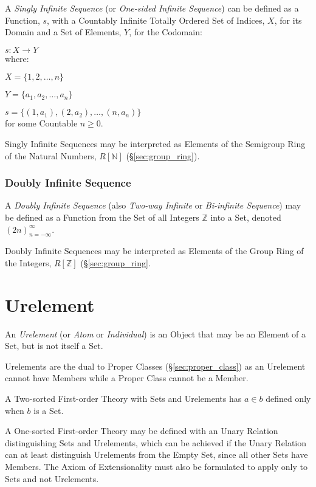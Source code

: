 A \emph{Singly Infinite Sequence} (or \emph{One-sided Infinite
  Sequence}) can be defined as a Function, $s$, with a Countably
Infinite Totally Ordered Set of Indices, $X$, for its Domain and a Set
of Elements, $Y$, for the Codomain:

  $s : X \rightarrow Y$ \\
where:

  $X = \{1,2,\ldots,n\}$

  $Y = \{a_1, a_2,\ldots,a_n\}$

  $s = \{(1,a_1), (2,a_2),\ldots, (n,a_n)\}$ \\
for some Countable $n \geq 0$.

Singly Infinite Sequences may be interpreted as Elements of the
Semigroup Ring of the Natural Numbers, $R[\mathbb{N}]$
(\S\ref{sec:group_ring}).



\subsubsection{Doubly Infinite Sequence}\label{sec:doubly_infinite}

A \emph{Doubly Infinite Sequence} (also \emph{Two-way Infinite} or
\emph{Bi-infinite Sequence}) may be defined as a Function from the Set
of all Integers $\mathbb{Z}$ into a Set, denoted
$(2n)^{\infty}_{n=-\infty}$.

Doubly Infinite Sequences may be interpreted as Elements of the Group
Ring of the Integers, $R[\mathbb{Z}]$ (\S\ref{sec:group_ring}.



\section{Urelement}\label{sec:urelement}

An \emph{Urelement} (or \emph{Atom} or \emph{Individual}) is an Object
that may be an Element of a Set, but is not itself a Set.

Urelements are the dual to Proper Classes (\S\ref{sec:proper_class})
as an Urelement cannot have Members while a Proper Class cannot be a
Member.

A Two-sorted First-order Theory with Sets and Urelements has $a \in b$
defined only when $b$ is a Set.

A One-sorted First-order Theory may be defined with an Unary Relation
distinguishing Sets and Urelements, which can be achieved if the Unary
Relation can at least distinguish Urelements from the Empty Set, since
all other Sets have Members. The Axiom of Extensionality must also be
formulated to apply only to Sets and not Urelements.



